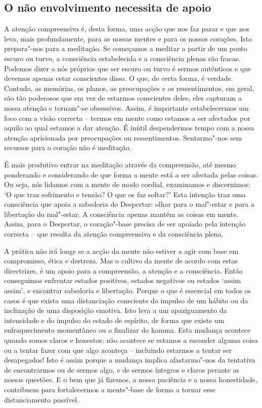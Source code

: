 \subsection{O não envolvimento necessita de apoio}

A atenção compreensiva é, desta forma, uma acção que nos faz parar e que nos
leva, mais profundamente, para as nossas mentes e para os nossos corações. Isto
prepara"-nos para a meditação. Se começamos a meditar a partir de um ponto escuro
ou turvo, a consciência estabelecida e a consciência plenas são fracas. Podemos
dizer a nós próprios que ser escuro ou turvo é sermos autênticos e que devemos
apenas estar conscientes disso. O que, de certa forma, é verdade. Contudo, as
memórias, os planos, as preocupações e os ressentimentos, em geral, são tão
poderosos que em vez de estarmos conscientes deles, eles capturam a nossa
atenção e tornam"-se obsessivos. Assim, é importante estabelecermos um foco com a
visão correcta -- termos em mente como estamos a ser afectados por aquilo ao
qual estamos a dar atenção. É inútil despendermos tempo com a nossa atenção
aprisionada por preocupações ou ressentimentos. Sentarmo"-nos sem recursos para o
coração não é meditação.

É mais produtivo entrar na meditação através da compreensão, até mesmo
ponderando e considerando de que forma a mente está a ser afectada pelas coisas.
Ou seja, nós lidamos com a mente de modo cordial, examinamos e discernimos: `O
que traz sofrimento e tensão? O que os faz soltar?' Esta intenção traz uma
consciência que apoia a sabedoria do Despertar: olhar para o mal"-estar e para a
libertação do mal"-estar. A consciência apenas mantém as coisas em mente. Assim,
para o Despertar, o coração"-base precisa de ser apoiado pela intenção correcta
-- que resulta da atenção compreensiva e da consciência plena.

\enlargethispage{\baselineskip}

A prática não irá longe se a acção da mente não estiver a agir com base em
compromisso, ética e destreza. Mas o cultivo da mente de acordo com estas
directrizes, é um apoio para a compreensão, a atenção e a consciência. Então
conseguimos enfrentar estados positivos, estados negativos ou estados `assim
assim', e encontrar sabedoria e libertação. Porque o que é essencial em todos os
casos é que exista uma distanciação consciente do impulso de um hábito ou da
inclinação de uma disposição emotiva. Isto leva a um apaziguamento da
intensidade e do impulso do estado de espírito, de forma que existe um
enfraquecimento momentâneo ou o finalizar do kamma. Esta mudança acontece quando
somos claros e honestos: não acontece se estamos a esconder alguma coisa ou a
tentar fazer com que algo aconteça -- incluindo estarmos a tentar ser
desapegados! Isto é assim porque a mudança implica afastarmo"-nos da tentativa de
encontrarmos ou de sermos algo, e de sermos íntegros e claros perante as nossas
questões. E o bem que já fizemos, a nossa paciência e a nossa honestidade,
contribuem para fortalecermos a mente"-base de forma a tornar esse distanciamento
possível.

